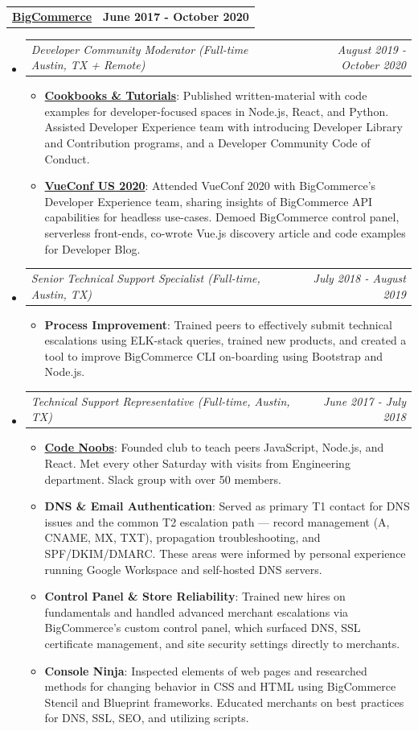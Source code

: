 \documentclass[letterpaper,10.8pt]{article}
\makeatletter
\newcommand{\resumeItem}[2]{
  \item\small{
    \textbf{#1}{: #2 \vspace{-2pt}}
  }
}
\newcommand{\jobLineItem}[2]{
  \vspace{0pt}\item[]
    \begin{tabular*}{0.98\textwidth}{l@{\extracolsep{\fill}}r}
      \textit{#1} & \textit{\small #2} \\
    \end{tabular*}\vspace{-4pt}
}
\newcommand{\employerTitle}[3]{
  \begin{tabular*}{1\textwidth}{l@{\extracolsep{\fill}}r}
    \href{#1}{\textbf{#2}} & \textbf{#3} \\
  \end{tabular*}\vspace{-4pt}
}
\newcommand{\resumeSubHeadingListStart}{\begin{itemize}[leftmargin=*]}
\newcommand{\resumeSubHeadingListEnd}{\end{itemize}}
\newcommand{\resumeItemListStart}{\begin{itemize}}
\newcommand{\resumeItemListEnd}{\end{itemize}\vspace{-5pt}}
\makeatother
\begin{document}
  \employerTitle
    {https://bigcommerce.com}{BigCommerce}{June 2017 - October 2020}
  \resumeSubHeadingListStart
    \jobLineItem
        {Developer Community Moderator (Full-time Austin, TX + Remote)}{August 2019 - October 2020}
    \resumeItemListStart
        \resumeItem{\href{https://bigcommerce.github.io/dev-library/}{Cookbooks \& Tutorials}}{Published written-material with code examples for developer-focused spaces in Node.js, React, and Python. Assisted Developer Experience team with introducing Developer Library and Contribution programs, and a Developer Community Code of Conduct.}
        \resumeItem{\href{https://medium.com/bigcommerce-developer-blog/introduction-to-vue-js-bigcommerce-b4388a2da4d2}{VueConf US 2020}}{Attended VueConf 2020 with BigCommerce’s Developer Experience team, sharing insights of BigCommerce API capabilities for headless use-cases. Demoed BigCommerce control panel, serverless front-ends, co-wrote Vue.js discovery article and code examples for Developer Blog.}
    \resumeItemListEnd
    \jobLineItem
        {Senior Technical Support Specialist (Full-time, Austin, TX)}{July 2018 - August 2019}
    \resumeItemListStart
        \resumeItem{Process Improvement}
        {Trained peers to effectively submit technical escalations using ELK-stack queries, trained new products, and created a tool to improve BigCommerce CLI on-boarding using Bootstrap and Node.js.}
      \resumeItemListEnd
    \newpage
    \jobLineItem
		    {Technical Support Representative (Full-time, Austin, TX)}{June 2017 - July 2018}
        \resumeItemListStart
        \resumeItem{\href{https://github.com/obrien-k/code-noobs-slackbot}{Code Noobs}}{Founded club to teach peers JavaScript, Node.js, and React. Met every other Saturday with visits from Engineering department. Slack group with over 50 members.}
        \resumeItem{DNS \& Email Authentication}{Served as primary T1 contact for DNS issues and the common T2 escalation path --- record management (A, CNAME, MX, TXT), propagation troubleshooting, and SPF/DKIM/DMARC. These areas were informed by personal experience running Google Workspace and self-hosted DNS servers.}
        \resumeItem{Control Panel \& Store Reliability}{Trained new hires on fundamentals and handled advanced merchant escalations via BigCommerce’s custom control panel, which surfaced DNS, SSL certificate management, and site security settings directly to merchants.}
        \resumeItem{Console Ninja}{Inspected elements of web pages and researched methods for changing behavior in CSS and HTML using BigCommerce Stencil and Blueprint frameworks. Educated merchants on best practices for DNS, SSL, SEO, and utilizing scripts.}
      \resumeItemListEnd
    \resumeSubHeadingListEnd
\end{document}
